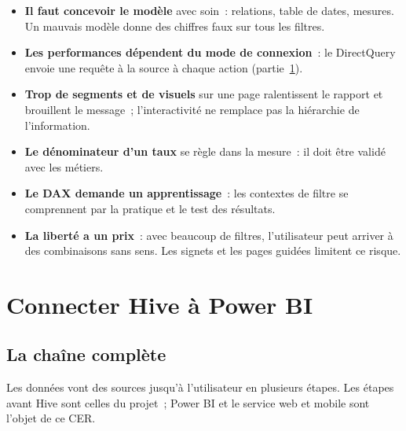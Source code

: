 \begin{itemize}
	\item \textbf{Il faut concevoir le modèle} avec soin~: relations, table de dates, mesures. Un mauvais modèle donne des chiffres faux sur tous les filtres.
	\item \textbf{Les performances dépendent du mode de connexion}~: le DirectQuery envoie une requête à la source à chaque action (partie~\ref{sec:hive-powerbi}).
	\item \textbf{Trop de segments et de visuels} sur une page ralentissent le rapport et brouillent le message~; l'interactivité ne remplace pas la hiérarchie de l'information.
	\item \textbf{Le dénominateur d'un taux} se règle dans la mesure~: il doit être validé avec les métiers.
	\item \textbf{Le DAX demande un apprentissage}~: les contextes de filtre se comprennent par la pratique et le test des résultats.
	\item \textbf{La liberté a un prix}~: avec beaucoup de filtres, l'utilisateur peut arriver à des combinaisons sans sens. Les signets et les pages guidées limitent ce risque.
\end{itemize}

\section{Connecter Hive à Power BI}\label{sec:hive-powerbi}

\subsection{La chaîne complète}

\noindent Les données vont des sources jusqu'à l'utilisateur en plusieurs étapes. Les étapes avant Hive sont celles du projet~; Power BI et le service web et mobile sont l'objet de ce CER.

